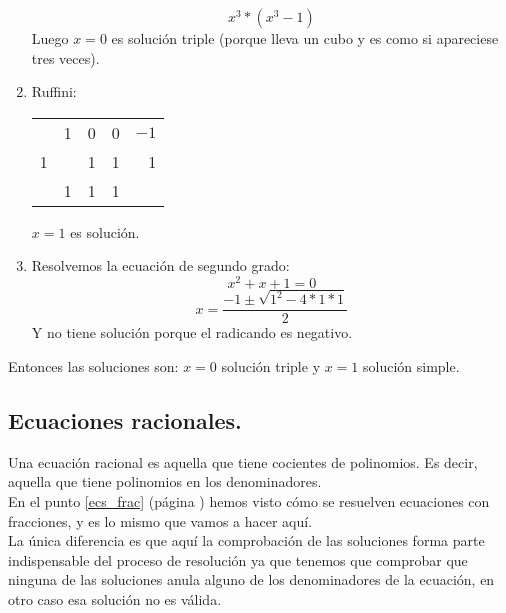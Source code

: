 \documentclass[a4paper,11pt,answers]{exam}
\begin{document}
\begin{questions}
\begin{solution}
\begin{enumerate}
      \[x^3*(x^3 -1)\]
      Luego $x=0$ es solución triple (porque lleva un cubo y es como si apareciese tres veces).
    \item Ruffini:
      \begin{center}
        \begin{tabular}{r|rrrr}
          &1&0&0&$-1$\\
          1&&1&1&1\\
          \hline
          &1&1&1
        \end{tabular}
      \end{center}
      $x=1$ es solución.
    \item Resolvemos la ecuación de segundo grado:
      \[x^2 + x + 1 = 0\]
      \[x = \frac{-1 \pm \sqrt{1^2 - 4*1*1}}{2}\]
      Y no tiene solución porque el radicando es negativo.
    \end{enumerate}
    Entonces las soluciones son: $x=0$ solución triple y $x=1$ solución simple.
  \end{solution}
\end{questions}

\subsection{Ecuaciones racionales.}
Una ecuación racional es aquella que tiene cocientes de polinomios. Es decir, aquella que tiene
polinomios en los denominadores.\\

En el punto \ref{ecs_frac} (página \pageref{ecs_frac}) hemos visto cómo se resuelven ecuaciones
con fracciones, y es lo mismo que vamos a hacer aquí.\\
La única diferencia es que aquí la comprobación de las soluciones forma parte indispensable del proceso de resolución ya que tenemos que comprobar que ninguna de las soluciones anula alguno de los
denominadores de la ecuación, en otro caso esa solución no es válida.\\
\end{document}
